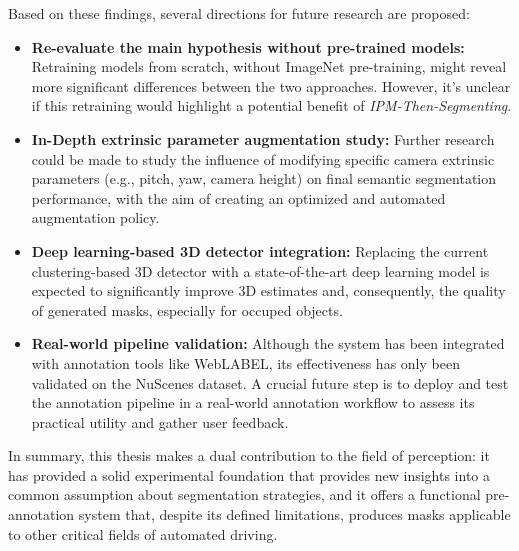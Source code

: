 Based on these findings, several directions for future research are proposed:
\begin{itemize}

    \item \textbf{Re-evaluate the main hypothesis without pre-trained models:} 
    Retraining models from scratch, without ImageNet pre-training, might reveal more significant differences between the two approaches. However, it's unclear if this retraining would highlight a potential benefit of \textit{IPM-Then-Segmenting}.

    \item \textbf{In-Depth extrinsic parameter augmentation study:} Further research could be made to study the influence of modifying specific camera extrinsic parameters (e.g., pitch, yaw, camera height) on final  semantic segmentation performance, with the aim of creating an optimized and automated augmentation policy.

    \item \textbf{Deep learning-based 3D detector integration:} Replacing the current clustering-based 3D detector with a state-of-the-art deep learning model is expected to significantly improve 3D estimates and, consequently, the quality of generated masks, especially for occuped objects.
    
    \item \textbf{Real-world pipeline validation:} Although the system has been integrated with annotation tools like WebLABEL, its effectiveness has only been validated on the NuScenes dataset. A crucial future step is to deploy and test the annotation pipeline in a real-world annotation workflow to assess its practical utility and gather user feedback.
    
\end{itemize}

In summary, this thesis makes a dual contribution to the field of  perception: it has provided a solid experimental foundation that provides new insights into a common assumption about  segmentation strategies, and it offers a functional pre-annotation system that, despite its defined limitations, produces masks applicable to other critical fields of automated driving.





























